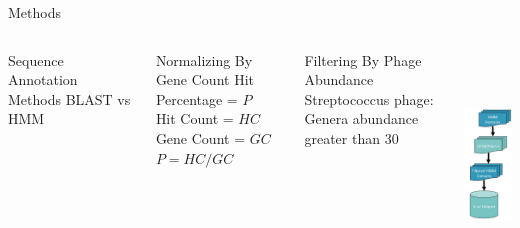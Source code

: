 \documentclass[11pt]{beamer}
\begin{document}
	\begin{frame}{Methods}
	\begin{columns}
	\begin{block}{Sequence Annotation Methods}
	BLAST vs \alert{HMM}
	\end{block}
	
	\begin{block}{Normalizing By Gene Count}
	Hit Percentage = $P$ \\
	Hit Count = $HC$ \\
	Gene Count = $GC$ \\
	\vspace{0.3cm}
	\hspace{1.5cm}	
	$P = {HC}/{GC}$
	\end{block}
	
	\begin{block}{Filtering By Phage Abundance}
	\alert{Streptococcus} phage: \\
	Genera abundance greater than 30
	\end{block}
	
	
	
	\hspace{-2cm}
	\includegraphics[height=6cm, width=3cm]{Pipeline.png}

	\end{columns}
	\end{frame}
	
\end{document}
